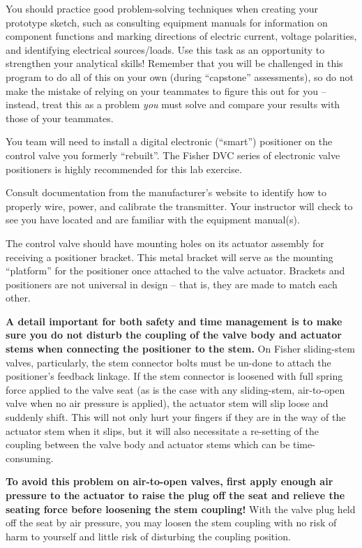 \begin{itemize}
You should practice good problem-solving techniques when creating your prototype sketch, such as consulting equipment manuals for information on component functions and marking directions of electric current, voltage polarities, and identifying electrical sources/loads.  Use this task as an opportunity to strengthen your analytical skills!  Remember that you will be challenged in this program to do all of this on your own (during ``capstone'' assessments), so do not make the mistake of relying on your teammates to figure this out for you -- instead, treat this as a problem {\it you} must solve and compare your results with those of your teammates.

\vskip 10pt

You team will need to install a digital electronic (``smart'') positioner on the control valve you formerly ``rebuilt''.  The Fisher DVC series of electronic valve positioners is highly recommended for this lab exercise.

Consult documentation from the manufacturer's website to identify how to properly wire, power, and calibrate the transmitter.  Your instructor will check to see you have located and are familiar with the equipment manual(s).

The control valve should have mounting holes on its actuator assembly for receiving a positioner bracket.  This metal bracket will serve as the mounting ``platform'' for the positioner once attached to the valve actuator.  Brackets and positioners are not universal in design -- that is, they are made to match each other.

\vskip 10pt

{\bf A detail important for both safety and time management is to make sure you do not disturb the coupling of the valve body and actuator stems when connecting the positioner to the stem.}  On Fisher sliding-stem valves, particularly, the stem connector bolts must be un-done to attach the positioner's feedback linkage.  If the stem connector is loosened with full spring force applied to the valve seat (as is the case with any sliding-stem, air-to-open valve when no air pressure is applied), the actuator stem will slip loose and suddenly shift.  This will not only hurt your fingers if they are in the way of the actuator stem when it slips, but it will also necessitate a re-setting of the coupling between the valve body and actuator stems which can be time-consuming.

{\bf To avoid this problem on air-to-open valves, first apply enough air pressure to the actuator to raise the plug off the seat and relieve the seating force before loosening the stem coupling!}  With the valve plug held off the seat by air pressure, you may loosen the stem coupling with no risk of harm to yourself and little risk of disturbing the coupling position.


\end{itemize}
